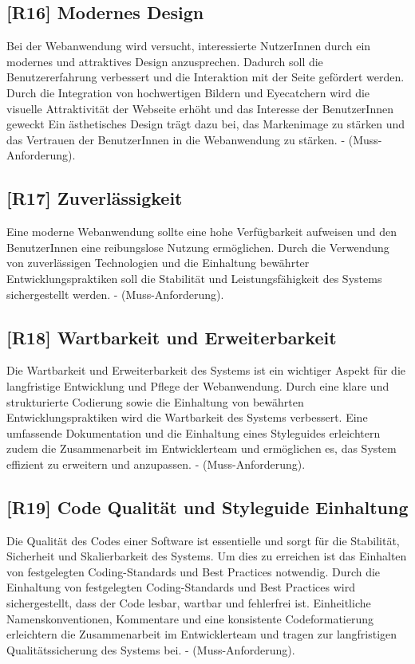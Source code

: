 \subsection{[R16] Modernes Design}

Bei der Webanwendung wird versucht, interessierte NutzerInnen durch ein modernes und attraktives Design anzusprechen.
Dadurch soll die Benutzererfahrung verbessert und die Interaktion mit der Seite gefördert werden.
Durch die Integration von hochwertigen Bildern und Eyecatchern wird die visuelle Attraktivität der Webseite erhöht und das Interesse der BenutzerInnen geweckt Ein ästhetisches Design trägt dazu bei, das Markenimage zu stärken und das Vertrauen der BenutzerInnen in die Webanwendung zu stärken.
- (Muss-Anforderung).

\subsection{[R17] Zuverlässigkeit}

Eine moderne Webanwendung sollte eine hohe Verfügbarkeit aufweisen und den BenutzerInnen eine reibungslose Nutzung ermöglichen.
Durch die Verwendung von zuverlässigen Technologien und die Einhaltung bewährter Entwicklungspraktiken soll die Stabilität und Leistungsfähigkeit des Systems sichergestellt werden.
- (Muss-Anforderung).

\subsection{[R18] Wartbarkeit und Erweiterbarkeit}

Die Wartbarkeit und Erweiterbarkeit des Systems ist ein wichtiger Aspekt für die langfristige Entwicklung und Pflege der Webanwendung.
Durch eine klare und strukturierte Codierung sowie die Einhaltung von bewährten Entwicklungspraktiken wird die Wartbarkeit des Systems verbessert.
Eine umfassende Dokumentation und die Einhaltung eines Styleguides erleichtern zudem die Zusammenarbeit im Entwicklerteam und ermöglichen es, das System effizient zu erweitern und anzupassen.
- (Muss-Anforderung).

\subsection{[R19] Code Qualität und Styleguide Einhaltung}

Die Qualität des Codes einer Software ist essentielle und sorgt für die Stabilität, Sicherheit und Skalierbarkeit des Systems.
Um dies zu erreichen ist das Einhalten von festgelegten Coding-Standards und Best Practices notwendig.
Durch die Einhaltung von festgelegten Coding-Standards und Best Practices wird sichergestellt, dass der Code lesbar, wartbar und fehlerfrei ist.
Einheitliche Namenskonventionen, Kommentare und eine konsistente Codeformatierung erleichtern die Zusammenarbeit im Entwicklerteam und tragen zur langfristigen Qualitätssicherung des Systems bei.
- (Muss-Anforderung).

